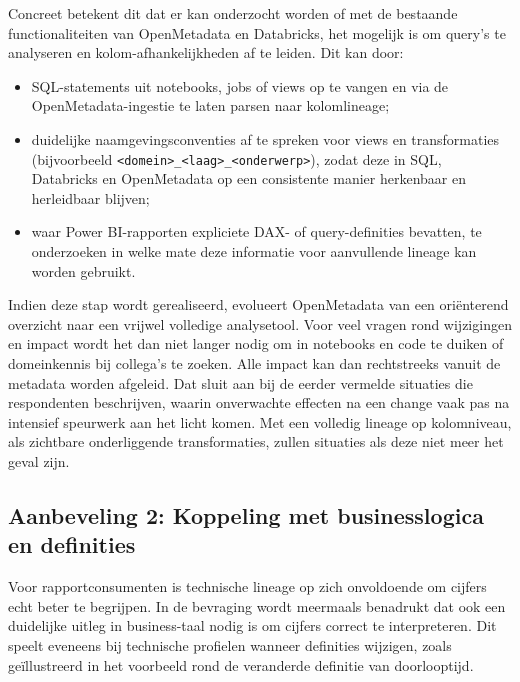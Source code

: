 Concreet betekent dit dat er kan onderzocht worden of met de bestaande functionaliteiten van OpenMetadata en Databricks, het mogelijk is om query's te analyseren en kolom-af\-han\-ke\-lijk\-he\-den af te leiden. Dit kan door:
\begin{itemize}
	\item SQL-statements uit notebooks, jobs of views op te vangen en via de OpenMetadata-ingestie te laten parsen naar kolomlineage;
	\item duidelijke naamgevingsconventies af te spreken voor views en transformaties (bijvoorbeeld \texttt{\textless domein\textgreater\_\textless laag\textgreater\_\textless onderwerp\textgreater}), zodat deze in SQL, Databricks en OpenMetadata op een consistente manier herkenbaar en herleidbaar blijven;
	\item waar Power BI-rapporten expliciete DAX- of query-definities bevatten, te onderzoeken in welke mate deze informatie voor aanvullende lineage kan worden gebruikt.
\end{itemize}

Indien deze stap wordt gerealiseerd, evolueert OpenMetadata van een oriënterend overzicht naar een vrijwel volledige analysetool. Voor veel vragen rond wijzigingen en impact wordt het dan niet langer nodig om in notebooks en code te duiken of domeinkennis bij collega’s te zoeken. Alle impact kan dan rechtstreeks vanuit de metadata worden afgeleid. Dat sluit aan bij de eerder vermelde situaties die respondenten beschrijven, waarin onverwachte effecten na een change vaak pas na intensief speurwerk aan het licht komen. Met een volledig lineage op kolomniveau, als zichtbare onderliggende transformaties, zullen situaties als deze niet meer het geval zijn.

\subsection*{Aanbeveling 2: Koppeling met businesslogica en definities}

Voor rapportconsumenten is technische lineage op zich onvoldoende om cijfers echt beter te begrijpen. In de bevraging wordt meermaals benadrukt dat  ook een duidelijke uitleg in bu\-si\-ness-taal nodig is om cijfers correct te interpreteren. Dit speelt eveneens bij technische profielen wanneer definities wijzigen, zoals geïllustreerd in het voorbeeld rond de veranderde definitie van doorlooptijd.\\

